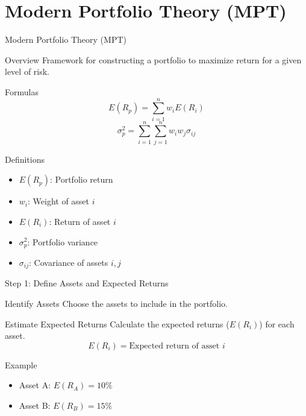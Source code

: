 \documentclass{beamer}
\begin{document}
\section{Modern Portfolio Theory (MPT)}
\begin{frame}{Modern Portfolio Theory (MPT)}
    \begin{block}{Overview}
        Framework for constructing a portfolio to maximize return for a given level of risk.
    \end{block}
    \begin{block}{Formulas}
        \begin{equation*}
            E(R_p) = \sum_{i=1}^{n} w_i E(R_i)
        \end{equation*}
        \begin{equation*}
            \sigma_p^2 = \sum_{i=1}^{n} \sum_{j=1}^{n} w_i w_j \sigma_{ij}
        \end{equation*}
    \end{block}
    \begin{block}{Definitions}
        \begin{multicols}{2}
            \begin{itemize}
                \item \(E(R_p)\): Portfolio return
                \item \(w_i\): Weight of asset \(i\)
                \item \(E(R_i)\): Return of asset \(i\)
                \item \(\sigma_p^2\): Portfolio variance
                \item \(\sigma_{ij}\): Covariance of assets \(i, j\)
            \end{itemize}
        \end{multicols}
    \end{block}
\end{frame}










\begin{frame}{Step 1: Define Assets and Expected Returns}
    \begin{block}{Identify Assets}
        Choose the assets to include in the portfolio.
    \end{block}
    \begin{block}{Estimate Expected Returns}
        Calculate the expected returns (\(E(R_i)\)) for each asset.
        \begin{equation*}
            E(R_i) = \text{Expected return of asset } i
        \end{equation*}
    \end{block}
    \begin{block}{Example}
        \begin{itemize}
            \item Asset A: \(E(R_A) = 10\%\)
            \item Asset B: \(E(R_B) = 15\%\)
        \end{itemize}
    \end{block}
\end{frame}
\end{document}
